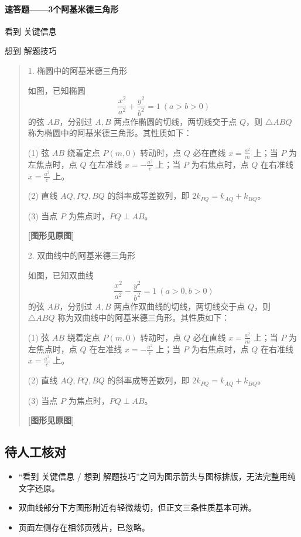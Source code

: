 \documentclass[UTF8,a4paper,11pt]{ctexart}
\begin{document}
\paragraph{速答题——3个阿基米德三角形}
看到 关键信息

想到 解题技巧

\begin{quote}
1. 椭圆中的阿基米德三角形

如图，已知椭圆
\[
\frac{x^2}{a^2}+\frac{y^2}{b^2}=1\ (a>b>0)
\]
的弦 $AB$，分别过 $A,B$ 两点作椭圆的切线，两切线交于点 $Q$，则 $\triangle ABQ$ 称为椭圆中的阿基米德三角形。其性质如下：

(1) 弦 $AB$ 绕着定点 $P(m,0)$ 转动时，点 $Q$ 必在直线 $x=\frac{a^2}{m}$ 上；当 $P$ 为左焦点时，点 $Q$ 在左准线 $x=-\frac{a^2}{c}$ 上；当 $P$ 为右焦点时，点 $Q$ 在右准线 $x=\frac{a^2}{c}$ 上。

(2) 直线 $AQ,PQ,BQ$ 的斜率成等差数列，即 $2k_{PQ}=k_{AQ}+k_{BQ}$。

(3) 当点 $P$ 为焦点时，$PQ\perp AB$。

\textbf{[图形见原图]}

2. 双曲线中的阿基米德三角形

如图，已知双曲线
\[
\frac{x^2}{a^2}-\frac{y^2}{b^2}=1\ (a>0,b>0)
\]
的弦 $AB$，分别过 $A,B$ 两点作双曲线的切线，两切线交于点 $Q$，则 $\triangle ABQ$ 称为双曲线中的阿基米德三角形。其性质如下：

(1) 弦 $AB$ 绕着定点 $P(m,0)$ 转动时，点 $Q$ 必在直线 $x=\frac{a^2}{m}$ 上；当 $P$ 为左焦点时，点 $Q$ 在左准线 $x=-\frac{a^2}{c}$ 上；当 $P$ 为右焦点时，点 $Q$ 在右准线 $x=\frac{a^2}{c}$ 上。

(2) 直线 $AQ,PQ,BQ$ 的斜率成等差数列，即 $2k_{PQ}=k_{AQ}+k_{BQ}$。

(3) 当点 $P$ 为焦点时，$PQ\perp AB$。

\textbf{[图形见原图]}
\end{quote}

\subsection*{待人工核对}

\begin{itemize}

\item “看到 关键信息 / 想到 解题技巧”之间为图示箭头与图标排版，无法完整用纯文字还原。

\item 双曲线部分下方图形附近有轻微裁切，但正文三条性质基本可辨。

\item 页面左侧存在相邻页残片，已忽略。

\end{itemize}
\end{document}
